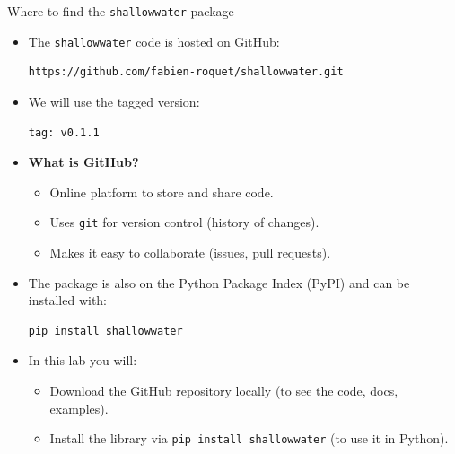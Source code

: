 \documentclass[]{beamer}
\begin{document}
\begin{frame}[fragile,shrink=8]{Where to find the \texttt{shallowwater} package}
\begin{itemize}
  \item The \texttt{shallowwater} code is hosted on GitHub:
\begin{verbatim}
https://github.com/fabien-roquet/shallowwater.git
\end{verbatim}

  \item We will use the tagged version:
\begin{verbatim}
tag: v0.1.1
\end{verbatim}

  \item \textbf{What is GitHub?}
    \begin{itemize}
      \item Online platform to store and share code.
      \item Uses \texttt{git} for version control (history of changes).
      \item Makes it easy to collaborate (issues, pull requests).
    \end{itemize}

  \item The package is also on the Python Package Index (PyPI) and can be
        installed with:
\begin{verbatim}
pip install shallowwater
\end{verbatim}

  \item In this lab you will:
    \begin{itemize}
      \item Download the GitHub repository locally (to see the code, docs, examples).
      \item Install the library via \texttt{pip install shallowwater} (to use it in Python).
    \end{itemize}
\end{itemize}
\end{frame}
\end{document}
